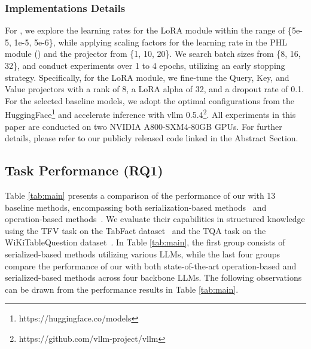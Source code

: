 {\subsubsection{Implementations Details} For \name, we explore the learning rates for the LoRA module within the range of \{5e-5, 1e-5, 5e-6\}, while applying scaling factors for the learning rate in the PHL module () and the projector from \{1, 10, 20\}. We search batch sizes from \{8, 16, 32\}, and conduct experiments over 1 to 4 epochs, utilizing an early stopping strategy. Specifically, for the LoRA module, we fine-tune the Query, Key, and Value projectors with a rank of 8, a LoRA alpha of 32, and a dropout rate of 0.1. For the selected baseline models, we adopt the optimal configurations from the HuggingFace\footnote{https://huggingface.co/models} and accelerate inference with vllm 0.5.4\footnote{https://github.com/vllm-project/vllm}. All experiments in this paper are conducted on two NVIDIA A800-SXM4-80GB GPUs. For further details, please refer to our publicly released code linked in the Abstract Section.

\subsection{Task Performance (RQ1)}
Table \ref{tab:main} presents a comparison of the performance of our \name with 13 baseline methods, encompassing both serialization-based methods~\cite{openai2023gpt35turbo,gpt4ominiurl,zhang2024tablellama,gemma,touvron2024llama3,hu2022lora} and operation-based methods~\cite{rajkumar2022evaluating,dater,wang2024chainoftable}. We evaluate their capabilities in structured knowledge using the TFV task on the TabFact dataset~\cite{2019TabFactA} and the TQA task on the WiKiTableQuestion dataset~\cite{pasupat2015compositional}. In Table \ref{tab:main}, the first group consists of serialized-based methods utilizing various LLMs, while the last four groups compare the performance of our \name with both state-of-the-art operation-based and serialized-based methods across four backbone LLMs. The following observations can be drawn from the performance results in Table \ref{tab:main}.

}
